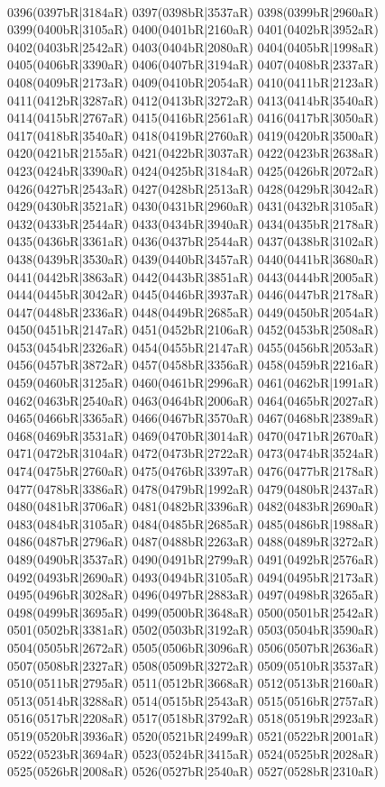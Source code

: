 \\0396(0397bR|3184aR) 0397(0398bR|3537aR) 0398(0399bR|2960aR) 0399(0400bR|3105aR) 0400(0401bR|2160aR) 0401(0402bR|3952aR) 0402(0403bR|2542aR) 0403(0404bR|2080aR) 0404(0405bR|1998aR) \\0405(0406bR|3390aR) 0406(0407bR|3194aR) 0407(0408bR|2337aR) 0408(0409bR|2173aR) 0409(0410bR|2054aR) 0410(0411bR|2123aR) 0411(0412bR|3287aR) 0412(0413bR|3272aR) 0413(0414bR|3540aR) \\0414(0415bR|2767aR) 0415(0416bR|2561aR) 0416(0417bR|3050aR) 0417(0418bR|3540aR) 0418(0419bR|2760aR) 0419(0420bR|3500aR) 0420(0421bR|2155aR) 0421(0422bR|3037aR) 0422(0423bR|2638aR) \\0423(0424bR|3390aR) 0424(0425bR|3184aR) 0425(0426bR|2072aR) 0426(0427bR|2543aR) 0427(0428bR|2513aR) 0428(0429bR|3042aR) 0429(0430bR|3521aR) 0430(0431bR|2960aR) 0431(0432bR|3105aR) \\0432(0433bR|2544aR) 0433(0434bR|3940aR) 0434(0435bR|2178aR) 0435(0436bR|3361aR) 0436(0437bR|2544aR) 0437(0438bR|3102aR) 0438(0439bR|3530aR) 0439(0440bR|3457aR) 0440(0441bR|3680aR) \\0441(0442bR|3863aR) 0442(0443bR|3851aR) 0443(0444bR|2005aR) 0444(0445bR|3042aR) 0445(0446bR|3937aR) 0446(0447bR|2178aR) 0447(0448bR|2336aR) 0448(0449bR|2685aR) 0449(0450bR|2054aR) \\0450(0451bR|2147aR) 0451(0452bR|2106aR) 0452(0453bR|2508aR) 0453(0454bR|2326aR) 0454(0455bR|2147aR) 0455(0456bR|2053aR) 0456(0457bR|3872aR) 0457(0458bR|3356aR) 0458(0459bR|2216aR) \\0459(0460bR|3125aR) 0460(0461bR|2996aR) 0461(0462bR|1991aR) 0462(0463bR|2540aR) 0463(0464bR|2006aR) 0464(0465bR|2027aR) 0465(0466bR|3365aR) 0466(0467bR|3570aR) 0467(0468bR|2389aR) \\0468(0469bR|3531aR) 0469(0470bR|3014aR) 0470(0471bR|2670aR) 0471(0472bR|3104aR) 0472(0473bR|2722aR) 0473(0474bR|3524aR) 0474(0475bR|2760aR) 0475(0476bR|3397aR) 0476(0477bR|2178aR) \\0477(0478bR|3386aR) 0478(0479bR|1992aR) 0479(0480bR|2437aR) 0480(0481bR|3706aR) 0481(0482bR|3396aR) 0482(0483bR|2690aR) 0483(0484bR|3105aR) 0484(0485bR|2685aR) 0485(0486bR|1988aR) \\0486(0487bR|2796aR) 0487(0488bR|2263aR) 0488(0489bR|3272aR) 0489(0490bR|3537aR) 0490(0491bR|2799aR) 0491(0492bR|2576aR) 0492(0493bR|2690aR) 0493(0494bR|3105aR) 0494(0495bR|2173aR) \\0495(0496bR|3028aR) 0496(0497bR|2883aR) 0497(0498bR|3265aR) 0498(0499bR|3695aR) 0499(0500bR|3648aR) 0500(0501bR|2542aR) 0501(0502bR|3381aR) 0502(0503bR|3192aR) 0503(0504bR|3590aR) \\0504(0505bR|2672aR) 0505(0506bR|3096aR) 0506(0507bR|2636aR) 0507(0508bR|2327aR) 0508(0509bR|3272aR) 0509(0510bR|3537aR) 0510(0511bR|2795aR) 0511(0512bR|3668aR) 0512(0513bR|2160aR) \\0513(0514bR|3288aR) 0514(0515bR|2543aR) 0515(0516bR|2757aR) 0516(0517bR|2208aR) 0517(0518bR|3792aR) 0518(0519bR|2923aR) 0519(0520bR|3936aR) 0520(0521bR|2499aR) 0521(0522bR|2001aR) \\0522(0523bR|3694aR) 0523(0524bR|3415aR) 0524(0525bR|2028aR) 0525(0526bR|2008aR) 0526(0527bR|2540aR) 0527(0528bR|2310aR) 